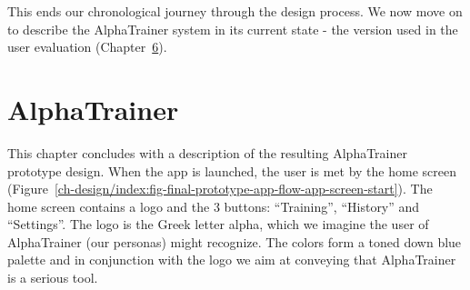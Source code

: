 \documentclass[a4paper,10pt,english,lof,lot,twoside]{puthesis}
\begin{document}
This ends our chronological journey through the design process. We now move
on to describe the AlphaTrainer system in its current state
- the version used in the user evaluation (Chapter {\hyperref[ch-evaluation/index:ch-evaluation]{6}}).


\section{AlphaTrainer}
\label{ch-design/index:ch-design-alphatrainer}\label{ch-design/index:alphatrainer}
This chapter concludes with a description of the resulting AlphaTrainer
prototype design. When the app is launched, the user is met by the home screen
(Figure \ref{ch-design/index:fig-final-prototype-app-flow-app-screen-start}). The home
screen contains a logo and the 3 buttons: ``Training'', ``History'' and
``Settings''. The logo is the Greek letter alpha, which we imagine the user of
AlphaTrainer (our personas) might recognize. The colors form a toned down blue
palette and in conjunction with the logo we aim at conveying that AlphaTrainer
is a serious tool.
\end{document}
